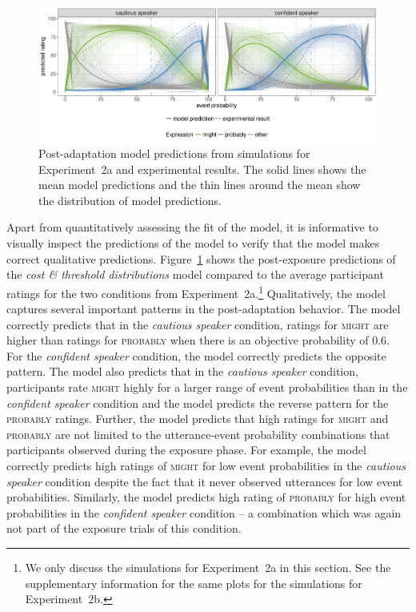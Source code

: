 \documentclass[man, floatsintext]{apa6}
\begin{document}
\begin{figure}
  \includegraphics[width=\textwidth]{plots/adaptation-posterior-predictions.pdf}
  \caption{Post-adaptation model predictions from simulations for Experiment~2a and experimental results. 
  The solid lines shows the mean model predictions and the thin lines around the mean show the distribution of model predictions. \label{fig:post-exposure-model}}
\end{figure}

Apart from quantitatively assessing the fit of the model, it is informative to visually inspect the predictions of the model to verify that the model makes correct qualitative predictions. 
Figure~\ref{fig:post-exposure-model} shows the post-exposure predictions of the \textit{cost \& threshold distributions} model compared to the average participant ratings for the two conditions from Experiment~2a.\footnote{
We only discuss the simulations for Experiment~2a in this section. See the supplementary information for the same plots for the simulations for Experiment~2b.} Qualitatively, 
the model captures several important patterns in the post-adaptation behavior. The model correctly predicts that in the \textit{cautious speaker} condition, ratings for \textsc{might} are 
higher than ratings for \textsc{probably} when there is an objective probability of 0.6. For the \textit{confident speaker} condition, the model correctly predicts the
opposite pattern. The model also predicts that in the \textit{cautious speaker} condition, participants rate \textsc{might} highly for a larger range of event probabilities than
in the \textit{confident speaker} condition and the model predicts the  reverse pattern for the \textsc{probably} ratings. Further, the model predicts that high ratings for \textsc{might} 
and \textsc{probably} are not limited to the utterance-event probability combinations that participants observed during the exposure phase. For example, the model correctly predicts
high ratings of \textsc{might} for low event probabilities in the \textit{cautious speaker} condition despite the fact that it never observed utterances for low event probabilities. Similarly,
the model predicts high rating of \textsc{probably} for high event probabilities in the \textit{confident speaker} condition -- a combination which was again not part of the exposure trials
of this condition.
\end{document}
